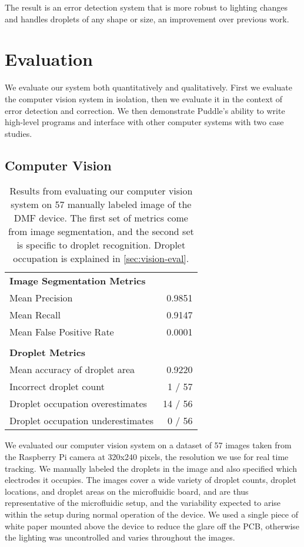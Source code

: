 \documentclass{jpaper}
\begin{document}
The result is an error detection system that is more robust to lighting changes and handles droplets of any shape or size, an improvement over previous work.


\section{Evaluation}
\label{sec:eval}

We evaluate our system both quantitatively and qualitatively.
First we evaluate the computer vision system in isolation, then we evaluate it in the context of error detection and correction.
We then demonstrate Puddle's ability to write high-level programs and interface with other computer systems with two case studies.

\subsection{Computer Vision}
\label{sec:vision-eval}

\begin{table}
  \centering
  \small
  \begin{tabular}{lr}
    \bf Image Segmentation Metrics \\
    Mean Precision & 0.9851 \\
    Mean Recall & 0.9147 \\
    Mean False Positive Rate & 0.0001 \\
    \\
    \bf Droplet Metrics \\
    Mean accuracy of droplet area & 0.9220  \\
    Incorrect droplet count & 1 / 57 \\
    Droplet occupation overestimates & 14 / 56 \\
    Droplet occupation underestimates & 0 / 56 \\
  \end{tabular}
  \caption{
    Results from evaluating our computer vision system on 57 manually labeled image of the DMF device.
    The first set of metrics come from image segmentation, and the second set is specific to droplet recognition.
    Droplet occupation is explained in \autoref{sec:vision-eval}.
  }
  \label{tab:vision-results}
\end{table}

We evaluated our computer vision system on a dataset of 57 images taken from the Raspberry Pi camera at 320x240 pixels, the resolution we use for real time tracking.
We manually labeled the droplets in the image and also specified which electrodes it occupies.
The images cover a wide variety of droplet counts, droplet locations, and droplet areas on the microfluidic board, and are thus representative of the microfluidic setup, and the variability expected to arise within the setup during normal operation of the device.
We used a single piece of white paper mounted above the device to reduce the glare off the PCB, otherwise the lighting was uncontrolled and varies throughout the images.
\end{document}
